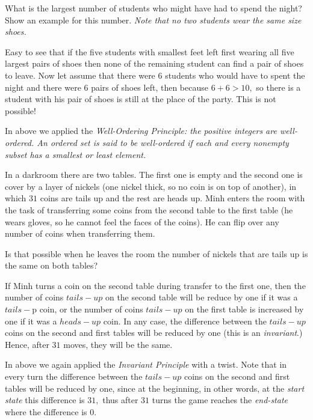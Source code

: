 \begin{multicols}{2}
\begin{example*}
		What is the largest number of students who might have had to spend the night? Show an example for this number.
		\textit{Note that no two students wear the same size shoes.}
	\end{example*}
	
	\begin{soln}
		Easy to see that if the five students with smallest feet left first wearing all five largest pairs of shoes
		then none of the remaining student can find a pair of shoes to leave.
		Now let assume that there were 6 students who would have to spent the night and there were 6 pairs of shoes left,
		then because $6 + 6 > 10,$ so there is a student with his pair of shoes is still at the place of the party. This is not possible!
		
		In above we applied the \textit{Well-Ordering Principle: the positive integers are well-ordered.
			An ordered set is said to be well-ordered if each and every nonempty subset has a smallest or least element.} 
	\end{soln}
	
	\begin{example*}
		
		In a darkroom there are two tables. The first one is empty and the second one is cover by a layer of nickels
		(one nickel thick, so no coin is on top of another), in which $31$ coins are tails up and the rest are heads up.
		Minh enters the room with the task of transferring some coins from the second table to the first table
		(he wears gloves, so he cannot feel the faces of the coins). He can flip over any number of coins when transferring them.
		
		Is that possible when he leaves the room the number of nickels that are tails up is the same on both tables?
	\end{example*}
	
	\begin{soln}
		If Minh turns a coin on the second table during transfer to the first one,
		then the number of coins $tails-up$ on the second table will be reduce by one if it was a $tails-$p coin,
		or the number of coins $tails-up$ on the first table is increased by one if it was a $heads-up$ coin.
		In any case, the difference between the $tails-up$ coins on the second and first tables will be reduced by one
		(this is an \textit{invariant}.) Hence, after $31$ moves, they will be the same.
		
		In above we again applied the \textit{Invariant Principle} with a twist.
		Note that in every turn the difference between the $tails-up$ coins on the second and first tables will be reduced by one,
		since at the beginning, in other words, at the \textit{start state} this difference is $31,$
		thus after $31$ turns the game reaches the \textit{end-state} where the difference is $0.$
	\end{soln}
	

\end{multicols}
